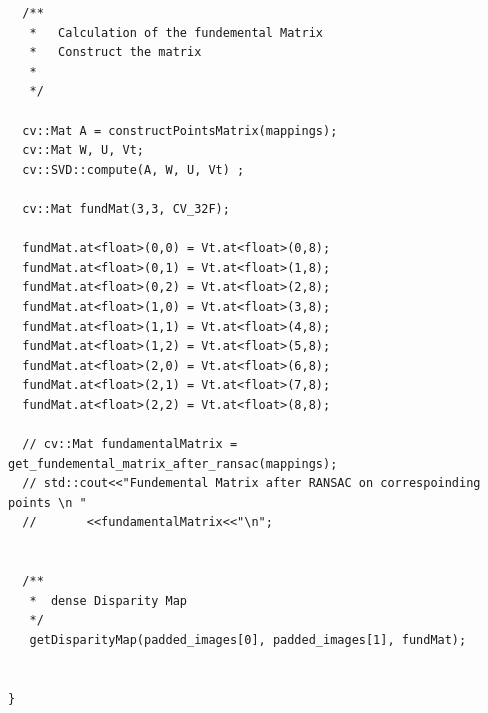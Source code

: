 \documentclass[letterpaper,11pt]{article}
\begin{document}
\begin{verbatim}
  /**
   *   Calculation of the fundemental Matrix
   *   Construct the matrix 
   *
   */

  cv::Mat A = constructPointsMatrix(mappings);
  cv::Mat W, U, Vt;
  cv::SVD::compute(A, W, U, Vt)	;

  cv::Mat fundMat(3,3, CV_32F);

  fundMat.at<float>(0,0) = Vt.at<float>(0,8);
  fundMat.at<float>(0,1) = Vt.at<float>(1,8);
  fundMat.at<float>(0,2) = Vt.at<float>(2,8);
  fundMat.at<float>(1,0) = Vt.at<float>(3,8);
  fundMat.at<float>(1,1) = Vt.at<float>(4,8);
  fundMat.at<float>(1,2) = Vt.at<float>(5,8);
  fundMat.at<float>(2,0) = Vt.at<float>(6,8);
  fundMat.at<float>(2,1) = Vt.at<float>(7,8);
  fundMat.at<float>(2,2) = Vt.at<float>(8,8);

  // cv::Mat fundamentalMatrix = get_fundemental_matrix_after_ransac(mappings);
  // std::cout<<"Fundemental Matrix after RANSAC on correspoinding points \n "
  // 	   <<fundamentalMatrix<<"\n";


  /**
   *  dense Disparity Map
   */
   getDisparityMap(padded_images[0], padded_images[1], fundMat);
  

}
\end{verbatim}  
\end{document}
